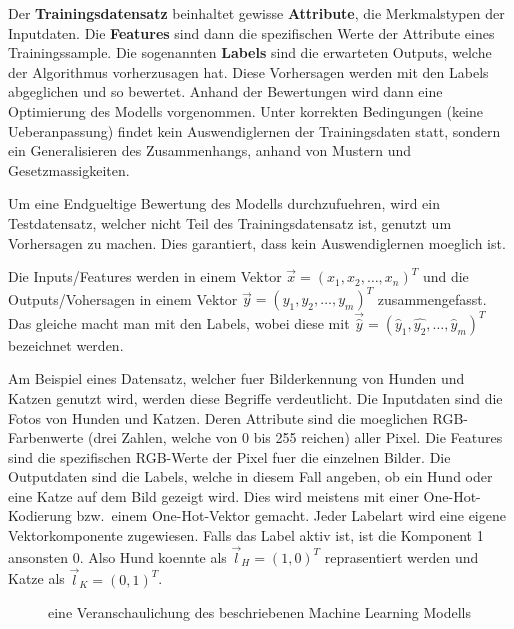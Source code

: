 \documentclass[../main]{subfiles}
\begin{document}
Der \textbf{Trainingsdatensatz} beinhaltet gewisse \textbf{Attribute}, die Merkmalstypen der Inputdaten.
Die \textbf{Features} sind dann die spezifischen Werte der Attribute eines Trainingssample.
Die sogenannten \textbf{Labels} sind die erwarteten Outputs, welche der Algorithmus vorherzusagen hat.
Diese Vorhersagen werden mit den Labels abgeglichen und so bewertet.
Anhand der Bewertungen wird dann eine Optimierung des Modells vorgenommen.
Unter korrekten Bedingungen (keine Ueberanpassung) findet kein Auswendiglernen der Trainingsdaten statt,
sondern ein Generalisieren des Zusammenhangs, anhand von Mustern und Gesetzmassigkeiten.
\par\medskip
Um eine Endgueltige Bewertung des Modells durchzufuehren, wird ein Testdatensatz, welcher nicht Teil des Trainingsdatensatz ist, genutzt um Vorhersagen zu machen.
Dies garantiert, dass kein Auswendiglernen moeglich ist.
\par\medskip
Die Inputs/Features werden in einem Vektor $\vec{x}={(x_1,x_2,\ldots,x_n)}^T$ und die Outputs/Vohersagen in einem Vektor $\vec{y}={(y_1,y_2,\ldots,y_m)}^T$ zusammengefasst.
Das gleiche macht man mit den Labels, wobei diese mit $\vec{\hat{y}}={(\hat{y}_1,\hat{y_2},\ldots,\hat{y}_m)}^T$ bezeichnet werden.
\par \medskip
Am Beispiel eines Datensatz, welcher fuer Bilderkennung von Hunden und Katzen genutzt wird, werden diese Begriffe verdeutlicht.
Die Inputdaten sind die Fotos von Hunden und Katzen. Deren Attribute sind die moeglichen RGB-Farbenwerte (drei Zahlen, welche von 0 bis 255 reichen) aller Pixel.
Die Features sind die spezifischen RGB-Werte der Pixel fuer die einzelnen Bilder. Die Outputdaten sind die Labels, welche in diesem Fall angeben, ob ein Hund oder eine Katze auf dem Bild gezeigt wird.
Dies wird meistens mit einer One-Hot-Kodierung bzw.\ einem One-Hot-Vektor gemacht. Jeder Labelart wird eine eigene Vektorkomponente zugewiesen. Falls das Label aktiv ist, ist die Komponent 1 ansonsten 0. Also Hund koennte als $\vec{l}_H={(1,0)}^T$ reprasentiert werden und Katze als $\vec{l}_K={(0,1)}^T$.

\begin{figure}[h!]
  \centering
  \begin{tikzpicture}[node distance=5cm,auto]

  \end{tikzpicture}

  \caption{eine Veranschaulichung des beschriebenen Machine Learning Modells}
\end{figure}
\end{document}

